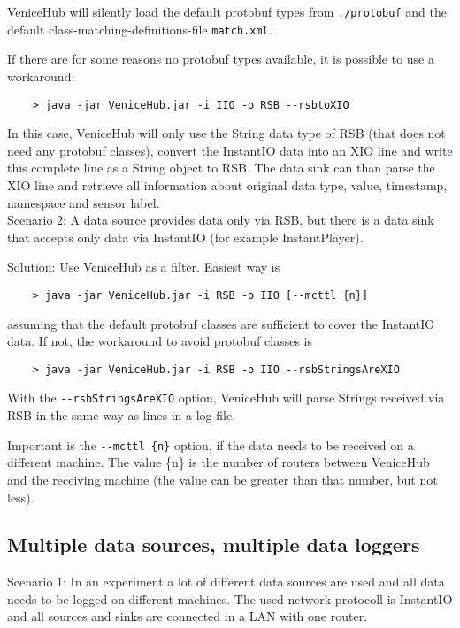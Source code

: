 \documentclass[german,a4paper]{article}
\begin{document}
VeniceHub will silently load the default protobuf types from \texttt{./protobuf} and the default class-matching-definitions-file \texttt{match.xml}.

If there are for some reasons no protobuf types available, it is possible to use a workaround:
\begin{lstlisting}
    > java -jar VeniceHub.jar -i IIO -o RSB --rsbtoXIO
\end{lstlisting}
In this case, VeniceHub will only use the String data type of RSB (that does not need any protobuf classes), convert the InstantIO data into an XIO line and write this complete line as a String object to RSB.
The data sink can than parse the XIO line and retrieve all information about original data type, value, timestamp, namespace and sensor label.\\

Scenario 2: A data source provides data only via RSB, but there is a data sink that accepts only data via InstantIO (for example InstantPlayer).

Solution: Use VeniceHub as a filter. Easiest way is
\begin{lstlisting}
    > java -jar VeniceHub.jar -i RSB -o IIO [--mcttl {n}]
\end{lstlisting}
assuming that the default protobuf classes are sufficient to cover the InstantIO data. If not, the workaround to avoid protobuf classes is
\begin{lstlisting}
    > java -jar VeniceHub.jar -i RSB -o IIO --rsbStringsAreXIO
\end{lstlisting}
With the \texttt{-\--rsbStringsAreXIO} option, VeniceHub will parse Strings received via RSB in the same way as lines in a log file.

Important is the \texttt{-\--mcttl \{n\}} option, if the data needs to be received on a different machine. The value \{n\} is the number of routers between VeniceHub and the receiving machine (the value can be greater than that number, but not less).

\subsection{Multiple data sources, multiple data loggers}

Scenario 1: In an experiment a lot of different data sources are used and all data needs to be logged on different machines. The used network protocoll is InstantIO and all sources and sinks are connected in a LAN with one router.
\end{document}
